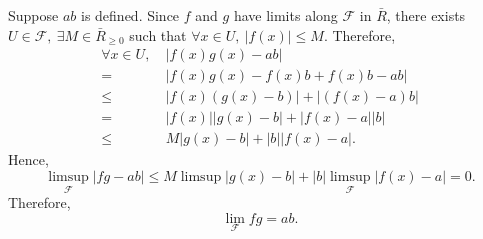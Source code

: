 \begin{proofenv}
    Suppose $ab$ is defined. Since $f$ and $g$ have limits along $\mathcal{F}$ in $\bar{R}$, there exists $U\in \mathcal{F}, \ \exists M\in \bar{R}_{\ge 0}$ such that $\forall x\in U,\ \left|f(x)\right|\le M$. Therefore,
    \begin{align*}
        \forall x\in U,\ &\left|f(x)g(x)-ab\right|\\
        =&\left|f(x)g(x)-f(x)b+f(x)b-ab\right|\\
        \le& \left|f(x)\left(g(x)-b\right)\right|+\left|\left(f(x)-a\right)b\right|\\
        =& \left|f(x)\right|\left|g(x)-b\right|+\left|f(x)-a\right| \left|b\right|\\
        \le &M \left|g(x)-b\right|+\left|b\right|\left|f(x)-a\right|.
    \end{align*}
    Hence,
    $$\limsup_{\mathcal{F}}\left|fg-ab\right|\le M\limsup\left|g(x)-b\right|+\left|b\right|\limsup_{\mathcal{F}}\left|f(x)-a\right|=0.$$
    Therefore, 
    $$\lim_{\mathcal{F}}fg=ab.$$
\end{proofenv}

